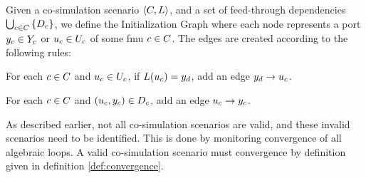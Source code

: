 \begin{definition}\label{def:initialization_graph}
  Given a co-simulation scenario $ \left\langle C, L \right\rangle $, and a set of feed-through dependencies $\bigcup_{c \in C}  \left\{ D_{c} \right\}$, we define the Initialization Graph where each node represents a port $y_{c} \in Y_{c}$ or $u_{c} \in U_{c}$ of some fmu $c \in C$. The edges are created according to the following rules:
  \begin{compactenum}
    \item For each $c \in C$ and $u_{c} \in U_{c}$, if $L(u_{c}) = y_{d}$, add an edge $y_{d} -> u_{c}$.
    \item For each $c \in C$ and $(u_{c},y_{c}) \in D_{c}$, add an edge $u_{c} -> y_{c}$.
  \end{compactenum}
\end{definition}

As described earlier, not all co-simulation scenarios are valid, and these invalid scenarios need to be identified. This is done by monitoring convergence of all algebraic loops. A valid co-simulation scenario must convergence by definition given in definition \ref{def:convergence}.

